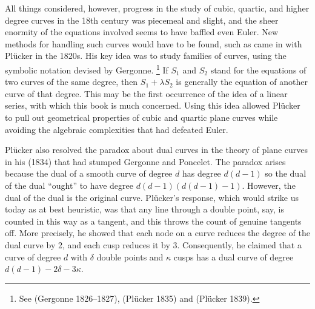 All things considered, however, progress in the study of cubic, quartic,
%
%
and higher degree curves in the 18th century was piecemeal and slight, and
the sheer enormity of the equations involved seems to have baffled even
Euler. New methods for handling such curves would have to be found, such
as came in with Pl\"ucker
%
in the 1820s. His key idea was to study families
of curves, using the symbolic notation devised by Gergonne.%
%
\footnote{See (Gergonne 1826--1827), (Pl\"ucker 1835) and (Pl\"ucker 1839).} 
%
If $S_1$
and $S_2$ stand for the equations of two curves of the same degree,
%
then $S_1 + \lambda S_2$ is generally the equation of another curve of
that degree. This may be the first occurrence of the idea of a linear
series,
%
 with which this book is much concerned. Using this idea allowed
Pl\"ucker to pull out geometrical properties of cubic and quartic plane
curves while avoiding the algebraic complexities that had defeated Euler.

Pl\"ucker also resolved the paradox
%
%
about dual curves in the theory of
plane curves in his (1834) that had stumped Gergonne
%
and Poncelet.
%
 The
paradox arises because the dual
%
of a smooth curve of degree $d$ has
degree $d(d-1)$
so the dual of the dual ``ought'' to have degree
$d(d-1)(d(d-1)-1)$. However, the dual of the dual is the original curve.
Pl\"ucker's response, which would strike us today as at best heuristic,
was that any line through a double point, say, is counted in this way
as a tangent, and this throws the count of genuine tangents off. More
precisely, he  showed that each node
%
on a curve reduces the degree
of the dual curve by 2, and each cusp
%
reduces it by 3. Consequently,
he claimed that  a curve of degree $d$ with $\delta$ double points and
$\kappa$ cusps has a dual curve  of degree $d(d-1) -  2\delta - 3\kappa$.




